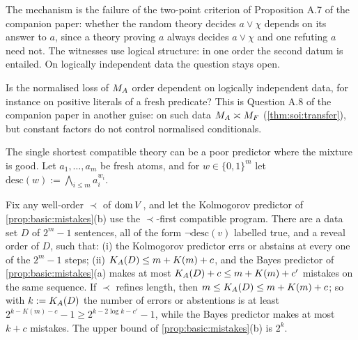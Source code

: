 The mechanism is the failure of the two-point criterion of Proposition A.7 of the companion paper: whether the random theory decides $a\vee\chi$ depends on its answer to $a$, since a theory proving $a$ always decides $a\vee\chi$ and one refuting $a$ need not. The witnesses use logical structure: in one order the second datum is entailed. On logically independent data the question stays open.

\begin{question}\label{q:basic:indeporder}
Is the normalised loss of $M_{A}$ order dependent on logically independent data, for instance on positive literals of a fresh predicate? This is Question A.8 of the companion paper in another guise: on such data $M_{A}\asymp M_{F}$ (\cref{thm:soi:transfer}), but constant factors do not control normalised conditionals.
\end{question}

The single shortest compatible theory can be a poor predictor where the mixture is good. Let $a_1,\dots,a_m$ be fresh atoms, and for $w\in\{0,1\}^m$ let $\mathrm{desc}(w):=\bigwedge_{i\le m}a_i^{w_i}$.

\begin{theorem}\label{thm:basic:kolmogorov}
Fix any well-order $\prec$ of $\operatorname{dom} V$, and let the Kolmogorov predictor of \cref{prop:basic:mistakes}(b) use the $\prec$-first compatible program. There are a data set $D$ of $2^m-1$ sentences, all of the form $\neg\mathrm{desc}(v)$ labelled true, and a reveal order of $D$, such that:
(i) the Kolmogorov predictor errs or abstains at every one of the $2^m-1$ steps;
(ii) $K_{A}(D)\le m+K(m)+c$, and the Bayes predictor of \cref{prop:basic:mistakes}(a) makes at most $K_{A}(D)+c\le m+K(m)+c'$ mistakes on the same sequence.
If $\prec$ refines length, then $m\le K_{A}(D)\le m+K(m)+c$; so with $k:=K_{A}(D)$ the number of errors or abstentions is at least $2^{k-K(m)-c}-1\ge2^{k-2\log k-c'}-1$, while the Bayes predictor makes at most $k+c$ mistakes. The upper bound of \cref{prop:basic:mistakes}(b) is $2^k$.
\end{theorem}

